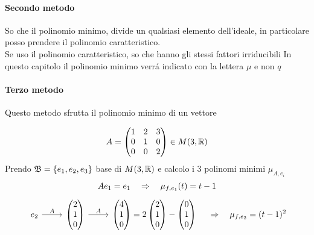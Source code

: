 \paragraph{Secondo metodo}
So che il polinomio minimo, divide un qualsiasi elemento dell'ideale, in particolare posso prendere il polinomio caratteristico.\\
Se uso il polinomio caratteristico, so che hanno gli stessi fattori irriducibili
\newpage
In questo capitolo il polinomio minimo verr\'a indicato con la lettera $\mu$ e non $q$
\paragraph{Terzo metodo}
Questo metodo sfrutta il polinomio minimo di un vettore
\begin{ex}
$$ A = \begin{pmatrix}	1 & 2 & 3 \\
									0 & 1 & 0 \\
									0 & 0 & 2 
\end{pmatrix} \in M(3,\mathbb{R})$$
Prendo $\mathfrak{B}= \{ e_1, e_2 , e_3\} $ base di $M(3,\mathbb{R})$ e calcolo i 3 polinomi minimi $\mu_{A,e_i}$
$$ A e_1 = e_1 \quad \Rightarrow \quad \mu_{f,e_1}(t) = t-1 $$
$$
\begin{tikzcd} e_2 \arrow[r,"A"] &\begin{pmatrix}
2 \\ 1 \\0 
\end{pmatrix} \arrow[r,"A"] &\begin{pmatrix}
4 \\ 1 \\0
\end{pmatrix} = 2\begin{pmatrix}
2 \\ 1 \\ 0
\end{pmatrix} - \begin{pmatrix}
0 \\ 1 \\0 
\end{pmatrix} 
\end{tikzcd} \quad \implica \quad \mu_{f,e_2} = (t-1)^2$$


\end{ex}

